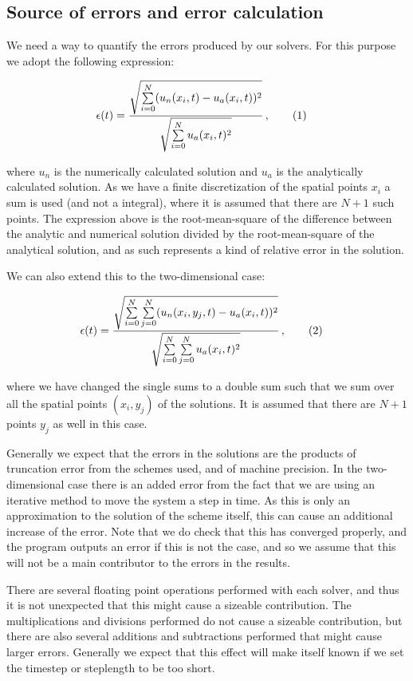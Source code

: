 \documentclass[reprint,english,notitlepage]{revtex4-1}  %
\newcommand\numberthis{\addtocounter{equation}{1}\tag{\theequation}}
\begin{document}
\subsection{Source of errors and error calculation} \label{sec:method_errors}

We need a way to quantify the errors produced by our solvers. For this purpose we adopt the following expression:

\begin{align*}
\epsilon (t) &= \frac{\sqrt{\sum\limits_{i=0}^N (u_n(x_i,t) - u_a(x_i,t))^2}}{\sqrt{\sum\limits_{i=0}^N u_a(x_i,t)^2}} \, , \numberthis \label{eq:error_1D}
\end{align*}

where $u_n$ is the numerically calculated solution and $u_a$ is the analytically calculated solution. As we have a finite discretization of the spatial points $x_i$ a sum is used (and not a integral), where it is assumed that there are $N+1$ such points. The expression above is the root-mean-square of the difference between the analytic and numerical solution divided by the root-mean-square of the analytical solution, and as such represents a kind of relative error in the solution. 

We can also extend this to the two-dimensional case:

\begin{align*}
\epsilon(t) &= \frac{\sqrt{\sum\limits_{i=0}^N \sum\limits_{j=0}^N (u_n(x_i,y_j,t) - u_a(x_i,t))^2}}{\sqrt{\sum\limits_{i=0}^N \sum\limits_{j=0}^N u_a(x_i,t)^2}} \, , \numberthis \label{eq:error_2D}
\end{align*}

where we have changed the single sums to a double sum such that we sum over all the spatial points $(x_i,y_j)$ of the solutions. It is assumed that there are $N+1$ points $y_j$ as well in this case.

Generally we expect that the errors in the solutions are the products of truncation error from the schemes used, and of machine precision. In the two-dimensional case there is an added error from the fact that we are using an iterative method to move the system a step in time. As this is only an approximation to the solution of the scheme itself, this can cause an additional increase of the error. Note that we do check that this has converged properly, and the program outputs an error if this is not the case, and so we assume that this will not be a main contributor to the errors in the results.

There are several floating point operations performed with each solver, and thus it is not unexpected that this might cause a sizeable contribution. The multiplications and divisions performed do not cause a sizeable contribution, but there are also several additions and subtractions performed that might cause larger errors. Generally we expect that this effect will make itself known if we set the timestep or steplength to be too short.
\end{document}
